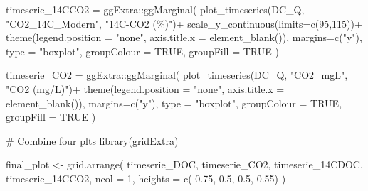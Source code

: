 \documentclass[
  letterpaper,
  DIV=11,
  numbers=noendperiod]{scrartcl}
\newenvironment{Shaded}{\begin{snugshade}}{\end{snugshade}}
\newcommand{\AttributeTok}[1]{\textcolor[rgb]{0.40,0.45,0.13}{#1}}
\newcommand{\CommentTok}[1]{\textcolor[rgb]{0.37,0.37,0.37}{#1}}
\newcommand{\ConstantTok}[1]{\textcolor[rgb]{0.56,0.35,0.01}{#1}}
\newcommand{\DecValTok}[1]{\textcolor[rgb]{0.68,0.00,0.00}{#1}}
\newcommand{\FloatTok}[1]{\textcolor[rgb]{0.68,0.00,0.00}{#1}}
\newcommand{\FunctionTok}[1]{\textcolor[rgb]{0.28,0.35,0.67}{#1}}
\newcommand{\NormalTok}[1]{\textcolor[rgb]{0.00,0.23,0.31}{#1}}
\newcommand{\OtherTok}[1]{\textcolor[rgb]{0.00,0.23,0.31}{#1}}
\newcommand{\SpecialCharTok}[1]{\textcolor[rgb]{0.37,0.37,0.37}{#1}}
\newcommand{\StringTok}[1]{\textcolor[rgb]{0.13,0.47,0.30}{#1}}
\begin{document}
\begin{Shaded}
\begin{Highlighting}[]
\NormalTok{timeserie\_14CCO2 }\OtherTok{=}\NormalTok{ ggExtra}\SpecialCharTok{::}\FunctionTok{ggMarginal}\NormalTok{(}
  \FunctionTok{plot\_timeseries}\NormalTok{(DC\_Q, }\StringTok{"CO2\_14C\_Modern"}\NormalTok{, }\StringTok{"14C{-}CO2 (\%)"}\NormalTok{)}\SpecialCharTok{+}
  \FunctionTok{scale\_y\_continuous}\NormalTok{(}\AttributeTok{limits=}\FunctionTok{c}\NormalTok{(}\DecValTok{95}\NormalTok{,}\DecValTok{115}\NormalTok{))}\SpecialCharTok{+}
   \FunctionTok{theme}\NormalTok{(}\AttributeTok{legend.position =} \StringTok{"none"}\NormalTok{, }\AttributeTok{axis.title.x =} \FunctionTok{element\_blank}\NormalTok{()),}
  \AttributeTok{margins=}\FunctionTok{c}\NormalTok{(}\StringTok{"y"}\NormalTok{), }\AttributeTok{type =} \StringTok{"boxplot"}\NormalTok{, }\AttributeTok{groupColour =} \ConstantTok{TRUE}\NormalTok{, }\AttributeTok{groupFill =} \ConstantTok{TRUE}\NormalTok{ )}

\NormalTok{timeserie\_CO2 }\OtherTok{=}\NormalTok{ ggExtra}\SpecialCharTok{::}\FunctionTok{ggMarginal}\NormalTok{(}
  \FunctionTok{plot\_timeseries}\NormalTok{(DC\_Q, }\StringTok{"CO2\_mgL"}\NormalTok{, }\StringTok{"CO2 (mg/L)"}\NormalTok{)}\SpecialCharTok{+}
     \FunctionTok{theme}\NormalTok{(}\AttributeTok{legend.position =} \StringTok{"none"}\NormalTok{, }\AttributeTok{axis.title.x =} \FunctionTok{element\_blank}\NormalTok{()),}
  \AttributeTok{margins=}\FunctionTok{c}\NormalTok{(}\StringTok{"y"}\NormalTok{), }\AttributeTok{type =} \StringTok{"boxplot"}\NormalTok{, }\AttributeTok{groupColour =} \ConstantTok{TRUE}\NormalTok{, }\AttributeTok{groupFill =} \ConstantTok{TRUE}\NormalTok{ )}


\CommentTok{\# Combine four plts}
\FunctionTok{library}\NormalTok{(gridExtra)}



\NormalTok{final\_plot }\OtherTok{\textless{}{-}} \FunctionTok{grid.arrange}\NormalTok{(}
\NormalTok{  timeserie\_DOC,}
\NormalTok{  timeserie\_CO2,}
\NormalTok{  timeserie\_14CDOC,}
\NormalTok{  timeserie\_14CCO2,}
  \AttributeTok{ncol =} \DecValTok{1}\NormalTok{,}
  \AttributeTok{heights =} \FunctionTok{c}\NormalTok{( }\FloatTok{0.75}\NormalTok{, }\FloatTok{0.5}\NormalTok{, }\FloatTok{0.5}\NormalTok{, }\FloatTok{0.55}\NormalTok{)}
\NormalTok{)}
\end{Highlighting}
\end{Shaded}
\end{document}
